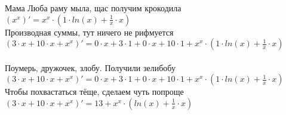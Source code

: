 \documentclass[a4paper,12pt]{article}
\begin{document}
Мама Люба раму мыла, щас получим крокодила\\
\begin{math}
	(x ^{x} )' = x ^{x}  \cdot (1 \cdot  ln (x)  +  \frac{1}{x}  \cdot x)
\end{math}\\
Производная суммы, тут ничего не рифмуется\\
\begin{math}
	(3 \cdot x + 10 \cdot x + x ^{x} )' = 0 \cdot x + 3 \cdot 1 + 0 \cdot x + 10 \cdot 1 + x ^{x}  \cdot (1 \cdot  ln (x)  +  \frac{1}{x}  \cdot x)
\end{math}\\
\\Поумерь, дружочек, злобу. Получили зелибобу\\ $(3 \cdot x + 10 \cdot x + x ^{x} )' = 0 \cdot x + 3 \cdot 1 + 0 \cdot x + 10 \cdot 1 + x ^{x}  \cdot (1 \cdot  ln (x)  +  \frac{1}{x}  \cdot x)$\\
Чтобы похвастаться тёще, сделаем чуть попроще\\
$(3 \cdot x + 10 \cdot x + x ^{x} )' = 13 + x ^{x}  \cdot ( ln (x)  +  \frac{1}{x}  \cdot x)$\\
\end{document}
